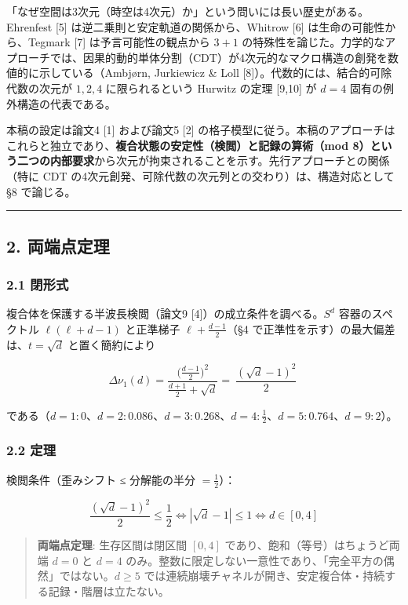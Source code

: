 \documentclass[
]{ltjsarticle}
\begin{document}
「なぜ空間は3次元（時空は4次元）か」という問いには長い歴史がある。Ehrenfest
{[}5{]} は逆二乗則と安定軌道の関係から、Whitrow {[}6{]}
は生命の可能性から、Tegmark {[}7{]} は予言可能性の観点から \(3{+}1\)
の特殊性を論じた。力学的なアプローチでは、因果的動的単体分割（CDT）が4次元的なマクロ構造の創発を数値的に示している（Ambjørn,
Jurkiewicz \& Loll {[}8{]}）。代数的には、結合的可除代数の次元が
\(1,2,4\) に限られるという Hurwitz の定理 {[}9,10{]} が \(d=4\)
固有の例外構造の代表である。

本稿の設定は論文4 {[}1{]} および論文5 {[}2{]}
の格子模型に従う。本稿のアプローチはこれらと独立であり、\textbf{複合状態の安定性（検閲）と記録の算術（mod
8）という二つの内部要求}から次元が拘束されることを示す。先行アプローチとの関係（特に
CDT の4次元創発、可除代数の次元列との交わり）は、構造対応として §8
で論じる。

\begin{center}\rule{0.5\linewidth}{0.5pt}\end{center}

\subsection{2. 両端点定理}\label{ux4e21ux7aefux70b9ux5b9aux7406}

\subsubsection{2.1 閉形式}\label{ux9589ux5f62ux5f0f}

複合体を保護する半波長検閲（論文9 {[}4{]}）の成立条件を調べる。\(S^d\)
容器のスペクトル \(\ell(\ell+d-1)\) と正準梯子 \(\ell+\tfrac{d-1}2\)（§4
で正準性を示す）の最大偏差は、\(t=\sqrt d\) と置く簡約により

\[
\Delta\nu_1(d)=\frac{\bigl(\tfrac{d-1}2\bigr)^2}{\tfrac{d+1}2+\sqrt d}=\boxed{\ \frac{(\sqrt d-1)^2}{2}\ }
\]

である（\(d=1:0\)、\(d=2:0.086\)、\(d=3:0.268\)、\(d=4:\tfrac12\)、\(d=5:0.764\)、\(d=9:2\)）。

\subsubsection{2.2 定理}\label{ux5b9aux7406}

検閲条件（歪みシフト ≤ 分解能の半分 \(=\tfrac12\)）：

\[
\frac{(\sqrt d-1)^2}{2}\le\frac12\iff|\sqrt d-1|\le1\iff d\in[0,4]
\]

\begin{quote}
\textbf{両端点定理}: 生存区間は閉区間 \([0,4]\)
であり、飽和（等号）はちょうど両端 \(d=0\) と \(d=4\)
のみ。整数に限定しない一意性であり、「完全平方の偶然」ではない。\(d\ge5\)
では連続崩壊チャネルが開き、安定複合体・持続する記録・階層は立たない。
\end{quote}
\end{document}
